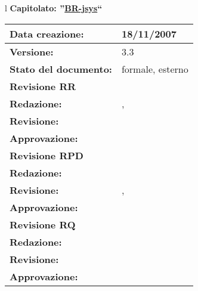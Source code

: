 

\newcommand{\lv}{3.3} %
\newcommand{\dt}{ Analisi Dei Requisiti }%


\begin{center}
\thispagestyle{plain}
\begin{table}[htbp]
\large{
\begin{tabular}{l}
\Large{\textbf{\textsf{Capitolato: ''\underline{BR-jsys}``}}} \\
\begin{tabular}{|p{6cm}|p{6cm}|} \hline
\textbf{Data creazione:} & 18/11/2007 \\ \hline
\textbf{Versione:} & \lv \\ \hline
\textbf{Stato del documento:} & formale, esterno \\ \hline
\textbf{Revisione RR} &   \\ \hline
\textbf{Redazione:} & \MB, \AT \\ \hline
\textbf{Revisione:} &   \MT \\ \hline
\textbf{Approvazione:}  & \ET \\ \hline
\textbf{Revisione RPD} &  \\ \hline 
\textbf{Redazione:} & \MT \\ \hline
\textbf{Revisione:} &  \AT, \MB \\ \hline
\textbf{Approvazione:}  & \ET \\ \hline
\textbf{Revisione RQ} &   \\ \hline
\textbf{Redazione:} & \ET \\ \hline
\textbf{Revisione:} & \MM \\ \hline
\textbf{Approvazione:}  & \MT \\ \hline

\end{tabular} \\
\end{tabular}
}
\end{table}


\end{center}
